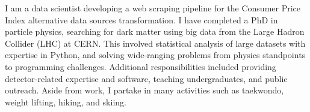 
\begin{cvparagraph}
    I am a data scientist developing a web scraping pipeline for the Consumer Price Index alternative data sources transformation.
    I have completed a PhD in particle physics, searching for dark matter using big data from the Large Hadron Collider (LHC) at CERN\@.
    This involved statistical analysis of large datasets with expertise in Python, and solving wide-ranging problems from physics standpoints to programming challenges.
    Additional responsibilities included providing detector-related expertise and software, teaching undergraduates, and public outreach.
    Aside from work, I partake in many activities such as taekwondo, weight lifting, hiking, and skiing.
\end{cvparagraph}
